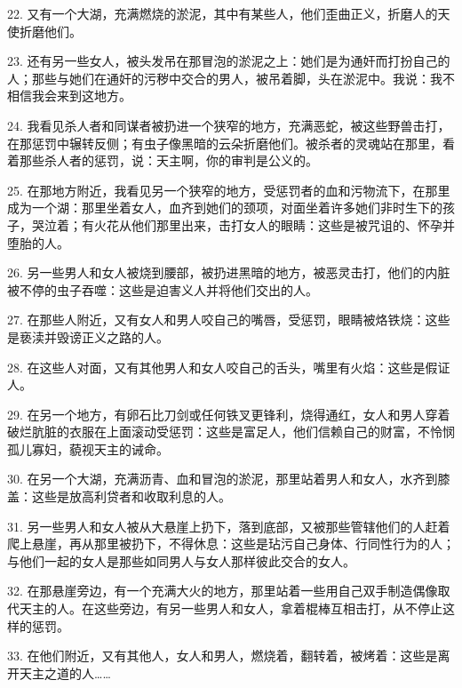 22. 又有一个大湖，充满燃烧的淤泥，其中有某些人，他们歪曲正义，折磨人的天使折磨他们。\par

23. 还有另一些女人，被头发吊在那冒泡的淤泥之上：她们是为通奸而打扮自己的人；那些与她们在通奸的污秽中交合的男人，被吊着脚，头在淤泥中。我说：我不相信我会来到这地方。\par

24. 我看见杀人者和同谋者被扔进一个狭窄的地方，充满恶蛇，被这些野兽击打，在那惩罚中辗转反侧；有虫子像黑暗的云朵折磨他们。被杀者的灵魂站在那里，看着那些杀人者的惩罚，说：天主啊，你的审判是公义的。\par

25. 在那地方附近，我看见另一个狭窄的地方，受惩罚者的血和污物流下，在那里成为一个湖：那里坐着女人，血齐到她们的颈项，对面坐着许多她们非时生下的孩子，哭泣着；有火花从他们那里出来，击打女人的眼睛：这些是被咒诅的、怀孕并堕胎的人。\par

26. 另一些男人和女人被烧到腰部，被扔进黑暗的地方，被恶灵击打，他们的内脏被不停的虫子吞噬：这些是迫害义人并将他们交出的人。\par

27. 在那些人附近，又有女人和男人咬自己的嘴唇，受惩罚，眼睛被烙铁烧：这些是亵渎并毁谤正义之路的人。\par

28. 在这些人对面，又有其他男人和女人咬自己的舌头，嘴里有火焰：这些是假证人。\par

29. 在另一个地方，有卵石比刀剑或任何铁叉更锋利，烧得通红，女人和男人穿着破烂肮脏的衣服在上面滚动受惩罚：这些是富足人，他们信赖自己的财富，不怜悯孤儿寡妇，藐视天主的诫命。\par

30. 在另一个大湖，充满沥青、血和冒泡的淤泥，那里站着男人和女人，水齐到膝盖：这些是放高利贷者和收取利息的人。\par

31. 另一些男人和女人被从大悬崖上扔下，落到底部，又被那些管辖他们的人赶着爬上悬崖，再从那里被扔下，不得休息：这些是玷污自己身体、行同性行为的人；与他们一起的女人是那些如同男人与女人那样彼此交合的女人。\par

32. 在那悬崖旁边，有一个充满大火的地方，那里站着一些用自己双手制造偶像取代天主的人。在这些旁边，有另一些男人和女人，拿着棍棒互相击打，从不停止这样的惩罚。\par

33. 在他们附近，又有其他人，女人和男人，燃烧着，翻转着，被烤着：这些是离开天主之道的人……\par

